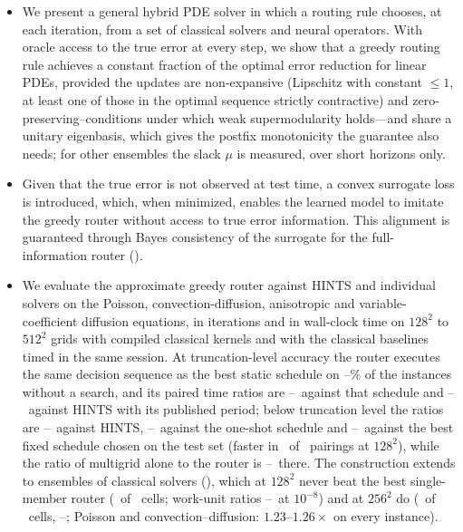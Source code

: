 \documentclass{article}
\newcommand{\edit}[1]{{\color{red}#1}}
\begin{document}
\begin{itemize}
    \item We present a general hybrid PDE solver in which a routing rule chooses, at each iteration, from a set of classical solvers and neural operators. With oracle access to the true error at every step, we show that a greedy routing rule
    achieves \edit{a constant fraction of the optimal error reduction} for linear PDEs, provided the updates are \edit{non-expansive (Lipschitz with constant $\le 1$, at least one of those in the optimal sequence strictly contractive)} and zero-preserving--conditions under which weak supermodularity holds\edit{---and share a unitary eigenbasis, which gives the postfix monotonicity the guarantee also needs; for other ensembles the slack $\mu$ is measured, over short horizons only}.
    \item  Given that the true error is not observed at test time, a convex surrogate loss is introduced, which, when minimized, enables the learned model to imitate the greedy router without access to true error information. This alignment is guaranteed through Bayes consistency\edit{ of the surrogate for the full-information router (\Cref{sec:approxgreedy})}.
    \item We evaluate the approximate greedy router against HINTS and individual solvers on the Poisson, convection-diffusion, anisotropic and variable-coefficient diffusion equations\edit{, in iterations and in wall-clock time on $128^2$ to $512^2$ grids with compiled classical kernels and with the classical baselines timed in the same session. At truncation-level accuracy the router executes the same decision sequence as the best static schedule on \caAgreeBestMin--\caAgreeBestMax\% of the instances without a search, and its paired time ratios are \caSpBestMin--\caSpBestMax\ against that schedule and \caSpHintsMin--\caSpHintsMax\ against HINTS with its published period; below truncation level the ratios are \caSpHintsDeepMin--\caSpHintsDeepMax\ against HINTS, \caSpOneshotDeepMin--\caSpOneshotDeepMax\ against the one-shot schedule and \caSpBestDeepMin--\caSpBestDeepMax\ against the best fixed schedule chosen on the test set (faster in \caCellsRouterBeatsBestDeep\ of \caNumCells\ pairings at $128^2$), while the ratio of multigrid alone to the router is \caVsMgDeepMin--\caVsMgDeepMax\ there. The construction extends to ensembles of classical solvers (\Cref{sec:wallclock_ens}), which at $128^2$ never beat the best single-member router (\caNestWins\ of \caNestNum\ cells; work-unit ratios \caNestMinRatio--\caNestMaxRatio\ at $10^{-8}$) and at $256^2$ do (\caNestWinsB\ of \caNestNumB\ cells, \caNestSpBMin--\caNestSpBMax; Poisson and convection--diffusion: $1.23$--$1.26\times$ on every instance)}.
\end{itemize}
\end{document}
